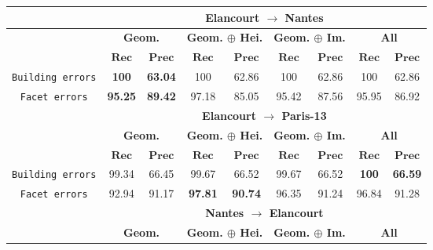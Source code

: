         \begin{table}[htbp]
            \footnotesize
            \centering
            \begin{tabular}{| c | c c | c c | c c | c c |}
                \hline
                & \multicolumn{8}{c|}{\textbf{Elancourt \(\rightarrow\) Nantes}} \\
                \hline
                &\multicolumn{2}{c|}{\textbf{Geom.}} & \multicolumn{2}{c|}{\textbf{Geom. \(\oplus\) Hei.}} & \multicolumn{2}{c|}{\textbf{Geom. \(\oplus\) Im.}} & \multicolumn{2}{c|}{\textbf{All}} \\
                \cline{2-9}
                & \(\bm{Rec}\) & \(\bm{Prec}\) &  \(\bm{Rec}\) & \(\bm{Prec}\) &  \(\bm{Rec}\) & \(\bm{Prec}\) &  \(\bm{Rec}\) & \(\bm{Prec}\) \\
                \hline
                \texttt{Building errors} & \textbf{100} & \textbf{63.04} & 100 & 62.86 & 100 & 62.86 & 100 & 62.86 \\
                \hline
                \texttt{Facet errors} & \textbf{95.25} & \textbf{89.42} & 97.18 & 85.05 & 95.42 & 87.56 & 95.95 & 86.92 \\
                \hline
                \hline
                & \multicolumn{8}{c|}{\textbf{Elancourt \(\rightarrow\) Paris-13}} \\
                \hline
                &\multicolumn{2}{c|}{\textbf{Geom.}} & \multicolumn{2}{c|}{\textbf{Geom. \(\oplus\) Hei.}} & \multicolumn{2}{c|}{\textbf{Geom. \(\oplus\) Im.}} & \multicolumn{2}{c|}{\textbf{All}} \\
                \cline{2-9}
                & \(\bm{Rec}\) & \(\bm{Prec}\) &  \(\bm{Rec}\) & \(\bm{Prec}\) &  \(\bm{Rec}\) & \(\bm{Prec}\) &  \(\bm{Rec}\) & \(\bm{Prec}\) \\
                \hline
                \texttt{Building errors} & 99.34 & 66.45 & 99.67 & 66.52 & 99.67 & 66.52 & \textbf{100} & \textbf{66.59} \\
                \hline
                \texttt{Facet errors} & 92.94 & 91.17 & \textbf{97.81} & \textbf{90.74} & 96.35 & 91.24 & 96.84 & 91.28 \\
                \hline
                \hline
                & \multicolumn{8}{c|}{\textbf{Nantes \(\rightarrow\) Elancourt}} \\
                \hline
                &\multicolumn{2}{c|}{\textbf{Geom.}} & \multicolumn{2}{c|}{\textbf{Geom. \(\oplus\) Hei.}} & \multicolumn{2}{c|}{\textbf{Geom. \(\oplus\) Im.}} & \multicolumn{2}{c|}{\textbf{All}} \\

\end{tabular}
\end{table}
